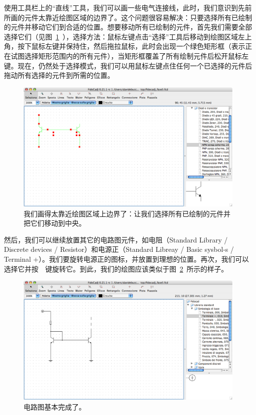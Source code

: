 \documentclass[10pt,a4paper,twoside]{scrreprt}
\newcommand{\keyevidence}[1]{\fbox{#1}}
\begin{document}
使用工具栏上的{}“直线”工具，我们可以画一些电气连接线，此时，我们意识到先前所画的元件太靠近绘图区域的边界了。这个问题很容易解决：只要选择所有已绘制的元件并移动它们到合适的位置。想要移动所有已绘制的元件，首先我们需要全部选择它们（见图~\ref{fig_fidocadj_fase3}~），选择方法：鼠标左键点击{}“选择”工具后移动到绘图区域左上角，按下鼠标左键并保持住，然后拖拉鼠标，此时会出现一个绿色矩形框（表示正在试图选择矩形范围内的所有元件），当矩形框覆盖了所有绘制元件后松开鼠标左键。现在，仍然处于选择模式，我们可以用鼠标左键点住任何一个已选择的元件后拖动所有选择的元件到所需的位置。

\begin{figure}
\includegraphics[width=1\textwidth,]{fidocadj_fase3} 
\caption{我们画得太靠近绘图区域上边界了：让我们选择所有已绘制的元件并把它们移动到中央。}
\label{fig_fidocadj_fase3} 
\end{figure}

然后，我们可以继续放置其它的电路图元件，如电阻（Standard Library / Discrete devices / Resistor）和电源正（Standard Libreay / Basic sysbol-s / Terminal +）。我们要旋转电源正的图标，并放置到理想的位置。再次，我们可以选择它并按~\keyevidence{R}~键旋转它。到此，我们的绘图应该类似于图~\ref{fig_fidocadj_fase4}~所示的样子。

\begin{figure}
\includegraphics[width=1\textwidth,]{fidocadj_fase4} 
\caption{电路图基本完成了。}
\label{fig_fidocadj_fase4} 
\end{figure}
\end{document}
